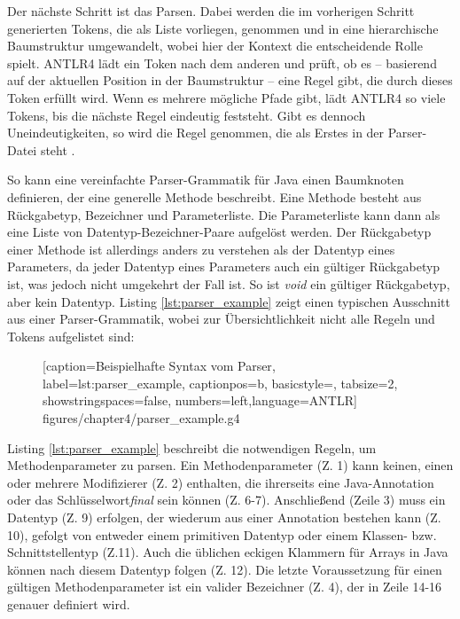Der nächste Schritt ist das  Parsen. Dabei werden die im vorherigen Schritt generierten Tokens, die als Liste vorliegen, genommen und in eine hierarchische Baumstruktur umgewandelt, wobei hier der Kontext die entscheidende Rolle spielt. ANTLR4 lädt ein Token nach dem anderen und prüft, ob es -- basierend auf der aktuellen Position in der Baumstruktur -- eine Regel gibt, die durch dieses Token erfüllt wird. Wenn es mehrere mögliche Pfade gibt, lädt ANTLR4 so viele Tokens, bis die nächste Regel eindeutig feststeht. Gibt es dennoch Uneindeutigkeiten, so wird die Regel genommen, die als Erstes in der Parser-Datei steht \cite[S.~10ff.]{TheDefinitiveANTLR4Reference}.

So kann eine vereinfachte Parser-Grammatik für Java einen Baumknoten definieren, der eine generelle Methode beschreibt. Eine Methode besteht aus Rückgabetyp, Bezeichner und Parameterliste. Die Parameterliste kann dann als eine Liste von Datentyp-Bezeichner-Paare aufgelöst werden. Der Rückgabetyp einer Methode ist allerdings anders zu verstehen als der Datentyp eines Parameters, da jeder Datentyp eines Parameters auch ein gültiger Rückgabetyp ist, was jedoch nicht umgekehrt der Fall ist. So ist \textit{void} ein gültiger Rückgabetyp, aber kein Datentyp. Listing \ref{lst:parser_example} zeigt einen typischen Ausschnitt aus einer Parser-Grammatik, wobei zur Übersichtlichkeit nicht alle Regeln und Tokens aufgelistet sind:
		\begin{figure} [htbp]
			
			[caption={Beispielhafte Syntax vom Parser},
			label={lst:parser_example},
			captionpos=b, basicstyle=\footnotesize, tabsize=2, showstringspaces=false,  numbers=left,language=ANTLR]
			{figures/chapter4/parser_example.g4}
		\end{figure}
		
Listing \ref{lst:parser_example} beschreibt die notwendigen Regeln, um Methodenparameter zu parsen. Ein Methodenparameter (Z. 1) kann keinen, einen oder mehrere  Modifizierer (Z. 2) enthalten, die ihrerseits eine Java-Annotation oder das Schlüsselwort\textit{final}  sein können (Z. 6-7). Anschließend (Zeile 3) muss ein Datentyp (Z. 9) erfolgen, der wiederum aus einer Annotation bestehen kann (Z. 10), gefolgt von entweder einem primitiven Datentyp oder einem Klassen- bzw. Schnittstellentyp (Z.11). Auch die üblichen eckigen Klammern für Arrays in Java können nach diesem Datentyp folgen (Z. 12). Die letzte Voraussetzung für einen gültigen Methodenparameter ist ein valider Bezeichner (Z. 4), der in Zeile 14-16 genauer definiert wird. 

